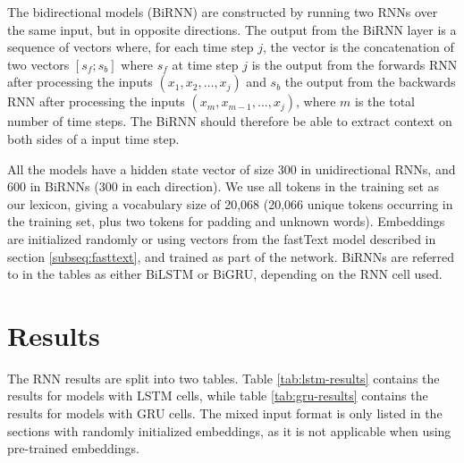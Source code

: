 The bidirectional models (BiRNN) are constructed by running two \acp{RNN}
over the same input, but in opposite directions. The output from the BiRNN
layer is a sequence of vectors where, for each time step $j$, the vector is
the concatenation of two vectors $[s_f;s_b]$ where $s_f$ at time step $j$ is
the output from the forwards \ac{RNN} after processing the inputs $(x_1, x_2,
\ldots, x_j)$ and $s_b$ the output from the backwards \ac{RNN} after
processing the inputs $(x_m, x_{m-1}, \ldots, x_j)$, where $m$ is the total
number of time steps. The BiRNN should therefore be able to extract context
on both sides of a input time step.

All the models have a hidden state vector of size 300 in unidirectional
\acp{RNN}, and 600 in BiRNNs (300 in each direction). We use all tokens in
the training set as our lexicon, giving a vocabulary size of 20,068 (20,066
unique tokens occurring in the training set, plus two tokens for padding and
unknown words). Embeddings are initialized randomly or using vectors from the
fastText model described in section \ref{subseq:fasttext}, and trained as
part of the network. BiRNNs are referred to in the tables as either BiLSTM or
BiGRU, depending on the RNN cell used.


\section{Results}

The RNN results are split into two tables. Table \ref{tab:lstm-results}
contains the results for models with \ac{LSTM} cells, while table
\ref{tab:gru-results} contains the results for models with \ac{GRU} cells.
The mixed input format is only listed in the sections with randomly
initialized embeddings, as it is not applicable when using pre-trained
embeddings.

